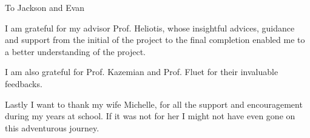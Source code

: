 \documentclass[12pt,american]{report}
\begin{document}
\vfill
\begin{center}
To Jackson and Evan
\end{center}
\vfill

%
I am grateful for my advisor Prof. Heliotis, whose insightful advices, guidance and support from the initial of the project to the final completion enabled me to a better understanding of the project.

I am also grateful for Prof. Kazemian and Prof. Fluet for their invaluable feedbacks.

Lastly I want to thank my wife Michelle, for all the support and encouragement during my years at school. If it was not for her I might not have even gone on this adventurous journey.

\newcommand{\etc} {\emph{etc.\/}}
\newcommand{\etal}{\emph{et~al.\/}}
\newcommand{\eg}  {\emph{e.g.\/}}
\newcommand{\ie}  {\emph{i.e.\/}}






\afterpreface%
\end{document}

